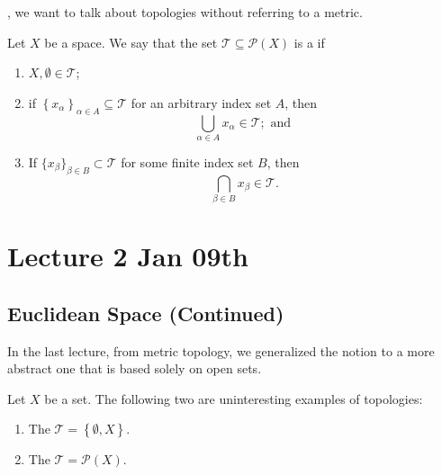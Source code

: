 \documentclass[notoc,notitlepage]{tufte-book}
\begin{document}

, we want to talk about topologies without referring to a metric.

\begin{defn}[Topology]\label{defn:topology}
  Let $X$ be a space. We say that the set $\mathcal{T} \subseteq \mathcal{P}(X)$ is a  if
  \begin{enumerate}
    \item $X, \emptyset \in \mathcal{T}$;
    \item if $\left\{ x_\alpha \right\}_{\alpha \in A} \subseteq \mathcal{T}$ for an arbitrary index set $A$, then
      \begin{equation*}
        \bigcup_{\alpha \in A} x_\alpha \in \mathcal{T}; \text{ and }
      \end{equation*}
    \item If $\{ x_\beta \}_{\beta \in B} \subset \mathcal{T}$ for some finite index set $B$, then
      \begin{equation*}
        \bigcap_{\beta \in B} x_\beta \in \mathcal{T}.
      \end{equation*}
  \end{enumerate}
\end{defn}



\chapter{Lecture 2 Jan 09th}%
\label{chp:lecture_2_jan_09th}

\section{Euclidean Space (Continued)}%
\label{sec:euclidean_space_continued}

In the last lecture, from metric topology, we generalized the notion to a more abstract one
that is based solely on open sets.

\begin{eg}
  Let $X$ be a set. The following two are
  uninteresting examples of topologies:
  \begin{enumerate}
    \item The  $\mathcal{T} = \left\{ \emptyset, X \right\}$.
    \item The  $\mathcal{T} = \mathcal{P}(X)$.
  \end{enumerate}
\end{eg}
\end{document}
